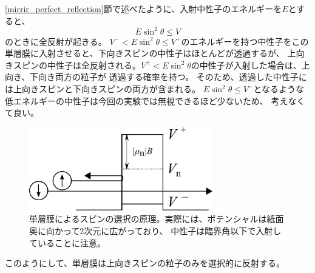 \ref{mirrir_perfect_reflection}節で述べたように、入射中性子のエネルギーを$E$とすると、
\[
E\sin^2\theta\leq V
\]
のときに全反射が起きる。
$V^-< E\sin^2\theta\leq V^+$のエネルギーを持つ中性子をこの単層膜に入射させると、下向きスピンの中性子はほとんどが透過するが、
上向きスピンの中性子は全反射される。$V^+<E\sin^2\theta$の中性子が入射した場合は、上向き、下向き両方の粒子が
透過する確率を持つ。
そのため、透過した中性子には上向きスピンと下向きスピンの両方が含まれる。
$E\sin^2\theta\leq V^-$となるような低エネルギーの中性子は今回の実験では無視できるほど少ないため、
考えなくて良い。

\begin{figure}[h]
\centering
\includegraphics[width=8cm]{mirror/mono_mirror.pdf}
\caption{単層膜によるスピンの選択の原理。実際には、ポテンシャルは紙面奥に向かって2次元に広がっており、
中性子は臨界角以下で入射していることに注意。}
\end{figure}
このようにして、単層膜は上向きスピンの粒子のみを選択的に反射する。

